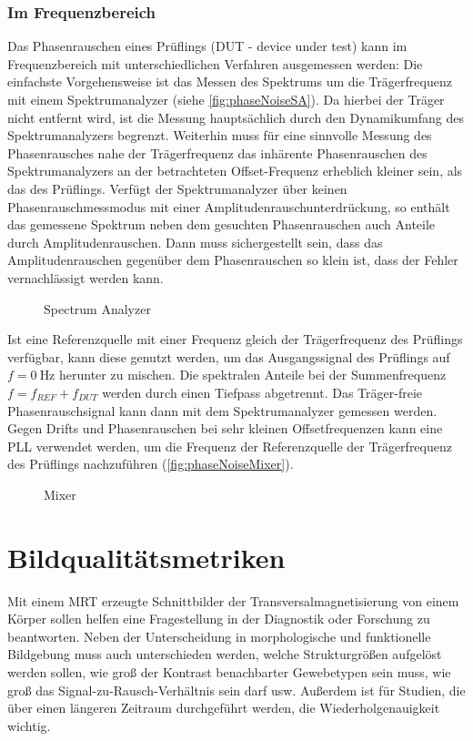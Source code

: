 \subsubsection{Im Frequenzbereich}
Das Phasenrauschen eines Prüflings (DUT - device under test) kann im Frequenzbereich mit unterschiedlichen Verfahren ausgemessen werden: Die einfachste Vorgehensweise ist das Messen des Spektrums um die Trägerfrequenz mit einem Spektrumanalyzer (siehe \autoref{fig:phaseNoiseSA}).
Da hierbei der Träger nicht entfernt wird, ist die Messung hauptsächlich durch den Dynamikumfang des Spektrumanalyzers begrenzt. Weiterhin muss für eine sinnvolle Messung des Phasenrausches nahe der Trägerfrequenz das inhärente Phasenrauschen des Spektrumanalyzers an der betrachteten Offset-Frequenz erheblich kleiner sein, als das des Prüflings. Verfügt der Spektrumanalyzer über keinen Phasenrauschmessmodus mit einer Amplitudenrauschunterdrückung, so enthält das gemessene Spektrum neben dem gesuchten Phasenrauschen auch Anteile durch Amplitudenrauschen. Dann muss sichergestellt sein, dass das Amplitudenrauschen gegenüber dem Phasenrauschen so klein ist, dass der Fehler vernachlässigt werden kann. 

\begin{figure}[H]
	\centering
	\caption[ph]{Spectrum Analyzer}
	\label{fig:phaseNoiseSA}
\end{figure}

Ist eine Referenzquelle mit einer Frequenz gleich der Trägerfrequenz des Prüflings verfügbar, kann diese genutzt werden, um das Ausgangssignal des Prüflings auf $f=\SI{0}{\hertz}$ herunter zu mischen. Die spektralen Anteile bei der Summenfrequenz $f=f_{REF}+f_{DUT}$ werden durch einen Tiefpass abgetrennt. Das Träger-freie Phasenrauschsignal kann dann mit dem Spektrumanalyzer gemessen werden.
Gegen Drifts und Phasenrauschen bei sehr kleinen Offsetfrequenzen kann eine PLL verwendet werden, um die Frequenz der Referenzquelle der Trägerfrequenz des Prüflings nachzuführen (\autoref{fig:phaseNoiseMixer}).

\begin{figure}[H]
	\centering
	\caption[ph]{Mixer}
	\label{fig:phaseNoiseMixer}
\end{figure}



\section{Bildqualitätsmetriken}
Mit einem MRT erzeugte Schnittbilder der Transversalmagnetisierung von einem Körper sollen helfen eine Fragestellung in der Diagnostik oder Forschung zu beantworten. Neben der Unterscheidung in morphologische und funktionelle Bildgebung muss auch unterschieden werden, welche Strukturgrößen aufgelöst werden sollen, wie groß der Kontrast benachbarter Gewebetypen sein muss, wie groß das Signal-zu-Rausch-Verhältnis sein darf usw. Außerdem ist für Studien, die über einen längeren Zeitraum durchgeführt werden, die Wiederholgenauigkeit wichtig.

